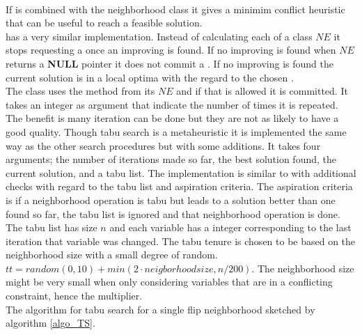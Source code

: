 \DecMargin{1em} \\
If  is combined with the neighborhood class  it gives a minimim 
conflict heuristic that can be useful to reach a feasible solution. \\ 
 has a very similar implementation. Instead of calculating each  of a 
 class $NE$ it stops requesting a  once an improving  is found. If no 
improving  is found when $NE$ returns a \textbf{NULL} pointer it does not commit a . If no 
improving  is found the current solution is in a local optima with the regard to the chosen 
. \\ 
The class  uses the method  from its  $NE$ and if that 
 is allowed it is committed. It takes an integer as argument that indicate the number of times it is 
repeated. The benefit is many iteration can be done but they are not as likely to have a good quality.  
Though tabu search is a metaheuristic it is implemented the same way as the other search procedures but with some 
additions. It takes four arguments; the number of iterations made so far, the best solution found, the current 
solution, and a tabu list. The implementation is similar to  with additional checks with regard 
to the tabu list and aspiration criteria. The aspiration criteria is if a neighborhood operation is tabu but leads to a 
solution better than one found so far, the tabu list is ignored and that neighborhood operation is done. The 
tabu list has size $n$ and each variable has a integer corresponding to the last iteration that variable was 
changed. The tabu tenure is chosen to be based on the neighborhood size with a small degree of random. $tt = 
random(0,10) + min(2\cdot neigborhood size, n/200)$. The neighborhood size might be very small when only considering 
variables that are in a conflicting constraint, hence the multiplier. \\ 
The algorithm for tabu search for a single flip neighborhood sketched by algorithm \ref{algo_TS}. \\ 
\IncMargin{1em}
